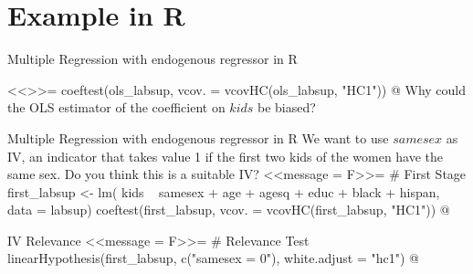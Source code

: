 \documentclass[11pt, aspectratio = 169]{beamer}
\begin{document}
\section{Example in R}


\begin{frame}[fragile]{Multiple Regression with endogenous regressor in R}  

\footnotesize
<<>>=
coeftest(ols_labsup, vcov. = vcovHC(ols_labsup, "HC1"))
@
\normalsize
\vspace{-0.3cm}
Why could the OLS estimator of the coefficient on $kids$ be biased?
  
\end{frame}

\begin{frame}[fragile]{Multiple Regression with endogenous regressor in R}  
We want to use $samesex$ as IV, an indicator that takes value 1 if the first two kids of the women have the same sex. Do you think this is a suitable IV?
\pause
\scriptsize
<<message = F>>=
# First Stage 
first_labsup <- lm( kids ~ samesex + age + agesq + educ + black + hispan, data = labsup)
coeftest(first_labsup, vcov. = vcovHC(first_labsup, "HC1"))
@
\end{frame}

\begin{frame}[fragile]{IV Relevance}  
\scriptsize
<<message = F>>=
# Relevance Test 
linearHypothesis(first_labsup, c("samesex = 0"), white.adjust = "hc1")
@
\end{frame}
\end{document}
